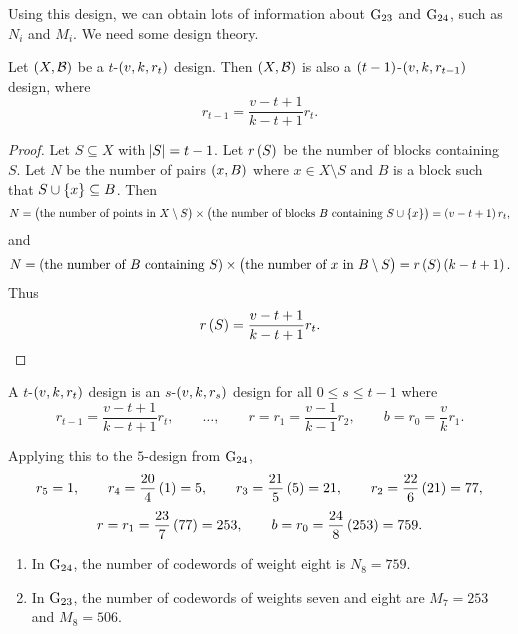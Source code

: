 Using this design, we can obtain lots of information about $ \mathrm{G}_{23} $ and $ \mathrm{G}_{24} $, such as $ N_i $ and $ M_i $. We need some design theory.

\begin{proposition}
Let $ \br{X, \BBB} $ be a $ t $-$ \br{v, k, r_t} $ design. Then $ \br{X, \BBB} $ is also a $ \br{t - 1} $-$ \br{v, k, r_{t - 1}} $ design, where
$$ r_{t - 1} = \dfrac{v - t + 1}{k - t + 1}r_t. $$
\end{proposition}

\begin{proof}
Let $ S \subseteq X $ with $ \abs{S} = t - 1 $. Let $ r\br{S} $ be the number of blocks containing $ S $. Let $ N $ be the number of pairs $ \br{x, B} $ where $ x \in X \setminus S $ and $ B $ is a block such that $ S \cup \cbr{x} \subseteq B $. Then
$$ N = \br{\text{the number of points in} \ X \setminus S} \times \br{\text{the number of blocks} \ B \ \text{containing} \ S \cup \cbr{x}} = \br{v - t + 1}r_t, $$
and
$$ N = \br{\text{the number of} \ B \ \text{containing} \ S} \times \br{\text{the number of} \ x \ \text{in} \ B \setminus S} = r\br{S}\br{k - t + 1}. $$
Thus
$$ r\br{S} = \dfrac{v - t + 1}{k - t + 1}r_t. $$
\end{proof}

\begin{corollary}
\label{cor:1.24}
A $ t $-$ \br{v, k, r_t} $ design is an $ s $-$ \br{v, k, r_s} $ design for all $ 0 \le s \le t - 1 $ where
$$ r_{t - 1} = \dfrac{v - t + 1}{k - t + 1}r_t, \qquad \dots, \qquad r = r_1 = \dfrac{v - 1}{k - 1}r_2, \qquad b = r_0 = \dfrac{v}{k}r_1. $$
\end{corollary}

\pagebreak

Applying this to the $ 5 $-design from $ \mathrm{G}_{24} $,
$$ r_5 = 1, \qquad r_4 = \dfrac{20}{4}\br{1} = 5, \qquad r_3 = \dfrac{21}{5}\br{5} = 21, \qquad r_2 = \dfrac{22}{6}\br{21} = 77, $$
$$ r = r_1 = \dfrac{23}{7}\br{77} = 253, \qquad b = r_0 = \dfrac{24}{8}\br{253} = 759. $$

\begin{proposition}
\hfill
\begin{enumerate}
\item In $ \mathrm{G}_{24} $, the number of codewords of weight eight is $ N_8 = 759 $.
\item In $ \mathrm{G}_{23} $, the number of codewords of weights seven and eight are $ M_7 = 253 $ and $ M_8 = 506 $.
\end{enumerate}
\end{proposition}

